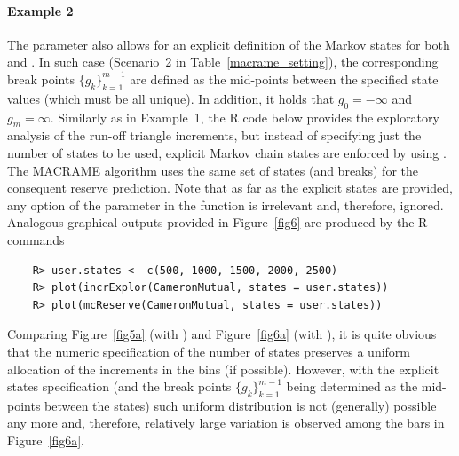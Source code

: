 \vspace{-10pt}\paragraph{Example 2} 
The parameter  also allows for an explicit definition of the Markov  states for both  and . 
In such case (Scenario~2 in Table~\ref{macrame_setting}), the corresponding break points $\{g_{k}\}_{k = 1}^{m - 1}$ are defined as the mid-points between the specified state values (which must be all unique). In addition, it holds that $g_0  = - \infty$ and $g_m = \infty$. Similarly as in Example~1, the R code below provides the exploratory analysis of the run-off triangle increments, but instead of specifying just the number of states to be used, explicit Markov chain states are enforced by using .
The  MACRAME algorithm uses the same set of states (and breaks) for the consequent reserve prediction. Note that as far as the explicit states are provided, any option of the parameter  in the   function is irrelevant and, therefore, ignored. Analogous graphical outputs provided in Figure~\ref{fig6} are produced by the R commands
\begin{verbatim}
    R> user.states <- c(500, 1000, 1500, 2000, 2500)
    R> plot(incrExplor(CameronMutual, states = user.states))
    R> plot(mcReserve(CameronMutual, states = user.states))
\end{verbatim}
Comparing Figure~\ref{fig5a} (with ) and Figure~\ref{fig6a} (with ), it is quite obvious that the numeric specification of the number of states preserves a uniform allocation of the increments in the bins (if possible). However, with the explicit states specification (and the break points $\{g_k\}_{k = 1}^{m - 1}$ being determined as the mid-points between the states) such uniform distribution is not (generally) possible any more and, therefore, relatively large variation is observed among the bars in Figure~\ref{fig6a}.  
